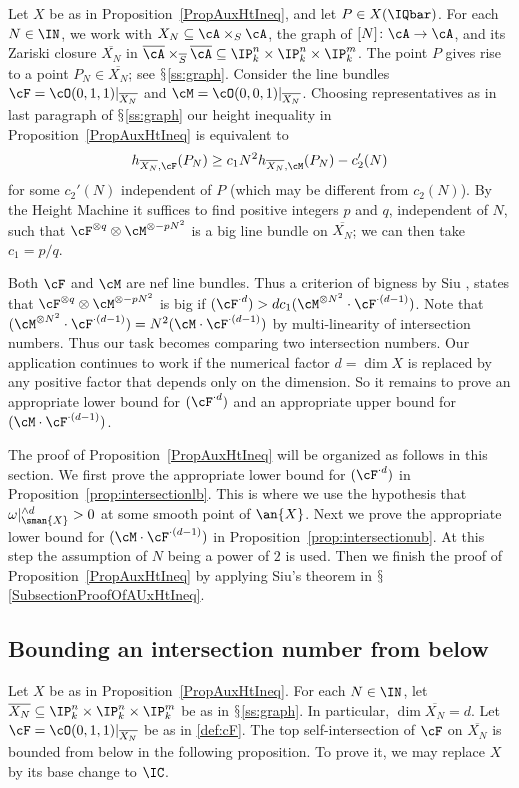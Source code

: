 Let $X$ be as in Proposition~\ref{PropAuxHtIneq}, and let $P \in
X(\IQbar)$. For each $N \in \IN$, we work with $X_N \subseteq
\cA\times_S \cA$, the graph of $[N] \colon \cA \rightarrow \cA$, and
its Zariski closure $\overline{X_N}$ in
$\overline{\cA}\times_{\overline{S}}\overline{\cA} \subseteq \IP_k^n
\times \IP_k^n \times \IP_k^m$. The point $P$ gives rise to a point
$P_N \in \overline{X_N}$; see $\mathsection$\ref{ss:graph}. Consider
the line bundles $\cF = \cO(0,1,1)|_{\overline{X_N}}$ and $\cM =
\cO(0,0,1)|_{\overline{X_N}}$. Choosing representatives as in
last paragraph of
$\mathsection$\ref{ss:graph}
 our height inequality in Proposition~\ref{PropAuxHtIneq} is equivalent to
\[
h_{\overline{X_N},\cF}(P_N)\ge c_1 N^2 h_{\overline{X_N},\cM}(P_N) - c_2'(N)
\]
for some $c_2'(N)$ independent of $P$ (which may be different from
$c_2(N)$). By the Height Machine  it suffices to find positive
integers $p$ and $q$, independent of $N$, such that $\cF^{\otimes q}
\otimes \cM^{\otimes -p N^2}$ is a big line bundle on
$\overline{X_N}$; we can then take $c_1=p/q$.

Both $\cF$ and $\cM$ are nef line bundles. Thus a criterion of bigness
by Siu \cite[Theorem~2.2.15]{PosAlgGeom}, states that $\cF^{\otimes q}
\otimes \cM^{\otimes -p N^2}$ is big if $(\cF^{\cdot d}) > d c_1
(\cM^{\otimes N^2} \cdot \cF^{\cdot (d-1)})$.
Note that $(\cM^{\otimes N^2} \cdot \cF^{\cdot (d-1)}) = N^2 (\cM \cdot \cF^{\cdot (d-1)})$ by multi-linearity of intersection numbers.
Thus our task
becomes comparing two intersection numbers. Our application continues
to work if the numerical
factor $d = \dim X$ is replaced by any
positive  factor that depends only on the dimension.
So it remains to prove an appropriate lower bound for $(\cF^{\cdot d})$ and an appropriate upper bound for $(\cM \cdot \cF^{\cdot (d-1)})$.

The proof of Proposition~\ref{PropAuxHtIneq} will be organized as follows in this section. We first prove the appropriate lower bound for $(\cF^{\cdot d})$ in Proposition~\ref{prop:intersectionlb}. This is where we use the hypothesis that $\omega|_{\sman{X}}^{\wedge d} >0$ at some smooth point of $\an{X}$. Next we prove the appropriate lower bound for $(\cM \cdot \cF^{\cdot (d-1)})$ in Proposition~\ref{prop:intersectionub}. At this step the assumption of $N$ being a power of $2$ is used. Then we finish the proof of Proposition~\ref{PropAuxHtIneq} by applying Siu's theorem in $\mathsection$\ref{SubsectionProofOfAUxHtIneq}.




\subsection{Bounding an intersection number from below}
Let $X$ be as in Proposition~\ref{PropAuxHtIneq}.
For each $N \in \IN$, let $\overline{X_N} \subseteq \IP_k^n \times
\IP_k^n \times \IP_k^m$ be as in $\mathsection$\ref{ss:graph}.
In particular, $\dim \overline{X_N} = d$.
 Let $\cF =
\cO(0,1,1)|_{\overline{X_N}}$ be as in \eqref{def:cF}. The top
self-intersection of $\cF$ on $\overline{X_N}$ is bounded from below
in the following proposition.
To prove it, we may replace $X$ by its base change to $\IC$.

